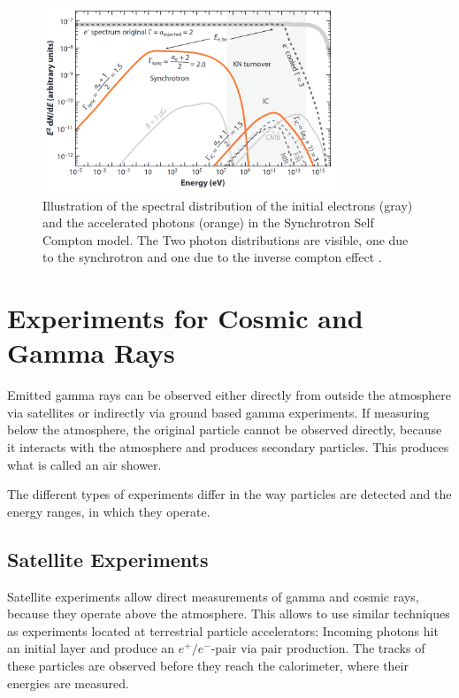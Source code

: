 \begin{figure}
	\centering
	\captionsetup{width=0.9\linewidth}
	\includegraphics[width=0.8\textwidth]{images/sct_spectrum.png}
	\caption{Illustration of the spectral distribution of 
	the initial electrons (gray) and the accelerated photons (orange)
	in the Synchrotron Self Compton model.
	The 
	Two photon distributions are visible, one due to the synchrotron and one  
	due to the inverse compton effect \cite{funcray}.
	}
	\label{fig:sct_model}
\end{figure}



\section{Experiments for Cosmic and Gamma Rays}
Emitted gamma rays can be observed either directly
from outside the atmosphere via satellites or indirectly
via ground based gamma experiments.
If measuring below the atmosphere, the original particle
cannot be observed directly, because it interacts with the atmosphere
and produces secondary particles. This produces what is called an air shower.

The different types of experiments differ in the way particles are detected and
the energy ranges, in which they operate.

\subsection{Satellite Experiments}
Satellite experiments allow direct measurements of gamma and cosmic rays, because they operate
above the atmosphere.
This allows to use similar techniques as experiments located at terrestrial 
particle accelerators: Incoming photons hit an initial layer and produce an $e^+/e^-$-pair 
via pair production. The tracks of these particles are observed before they reach the calorimeter,
where their energies are measured.

